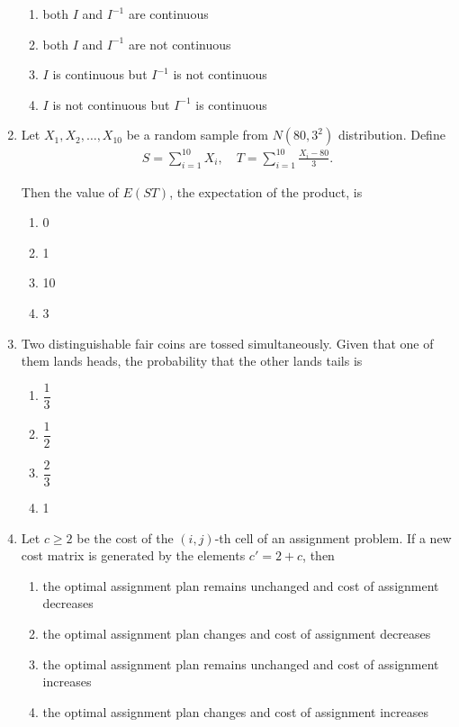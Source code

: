\documentclass[journal]{IEEEtran}
\numberwithin{equation}{enumi}
\numberwithin{figure}{enumi}
\begin{document}
\begin{enumerate}
\begin{enumerate}
\item both \(I\) and \(I^{-1}\) are continuous
\item both \(I\) and \(I^{-1}\) are not continuous
\item \(I\) is continuous but \(I^{-1}\) is not continuous
\item \(I\) is not continuous but \(I^{-1}\) is continuous
\end{enumerate}


\item Let \(X_1, X_2, \ldots, X_{10}\) be a random sample from \(N(80, 3^2)\) distribution. Define
\begin{align}
    S = \sum_{i=1}^{10} X_i, \quad T = \sum_{i=1}^{10} \frac{X_i - 80}{3}.
\end{align}


Then the value of \(E(ST)\), the expectation of the product, is
\hfill{}
\begin{multicols}{4}
\begin{enumerate}
\item 0
\item 1
\item 10
\item 3
\end{enumerate}
\end{multicols}

\item Two distinguishable fair coins are tossed simultaneously. Given that one of them lands heads, the probability that the other lands tails is
\hfill{}
\begin{multicols}{4}
\begin{enumerate}
\item \(\dfrac{1}{3}\)
\item \(\dfrac{1}{2}\)
\item \(\dfrac{2}{3}\)
\item 1
\end{enumerate}
\end{multicols}

\item Let \(c \geq 2\) be the cost of the \((i,j)\)-th cell of an assignment problem. If a new cost matrix is generated by the elements \(c' = 2 + c\), then
\hfill{}

\begin{enumerate}
\item the optimal assignment plan remains unchanged and cost of assignment decreases
\item the optimal assignment plan changes and cost of assignment decreases
\item the optimal assignment plan remains unchanged and cost of assignment increases
\item the optimal assignment plan changes and cost of assignment increases
\end{enumerate}



\end{enumerate}
\end{document}
